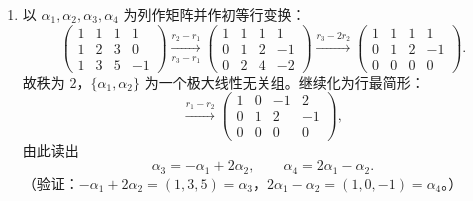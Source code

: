 \documentclass[12pt]{ctexart}
\begin{document}
\begin{enumerate}[label=\textbf{\arabic*.},itemsep=13pt]
\item 以 $\alpha_1,\alpha_2,\alpha_3,\alpha_4$ 为列作矩阵并作初等行变换：
  \[
  \begin{pmatrix}1&1&1&1\\1&2&3&0\\1&3&5&-1\end{pmatrix}
  \xrightarrow[r_3-r_1]{r_2-r_1}
  \begin{pmatrix}1&1&1&1\\0&1&2&-1\\0&2&4&-2\end{pmatrix}
  \xrightarrow{r_3-2r_2}
  \begin{pmatrix}1&1&1&1\\0&1&2&-1\\0&0&0&0\end{pmatrix}.
  \]
  故秩为 $2$，$\{\alpha_1,\alpha_2\}$ 为一个极大线性无关组。继续化为行最简形：
  \[
  \xrightarrow{r_1-r_2}
  \begin{pmatrix}1&0&-1&2\\0&1&2&-1\\0&0&0&0\end{pmatrix},
  \]
  由此读出
  \[
  \alpha_3=-\alpha_1+2\alpha_2,\qquad \alpha_4=2\alpha_1-\alpha_2.
  \]
  （验证：$-\alpha_1+2\alpha_2=(1,3,5)=\alpha_3$，$2\alpha_1-\alpha_2=(1,0,-1)=\alpha_4$。）
\end{enumerate}
\end{document}
